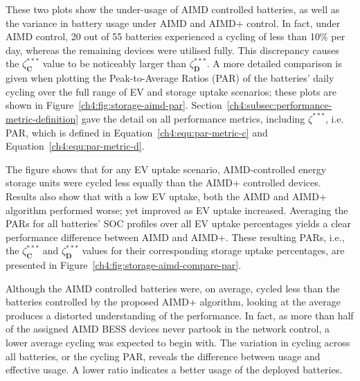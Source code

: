 

These two plots show the under-usage of AIMD controlled batteries, as well as the variance in battery usage under AIMD and AIMD+ control.
In fact, under AIMD control, 20 out of 55 batteries experienced a cycling of less than 10\% per day, whereas the remaining devices were utilised fully.
This discrepancy causes the $\zeta_\textbf{C}^{***}$ value to be noticeably larger than $\zeta_\textbf{D}^{***}$.
A more detailed comparison is given when plotting the Peak-to-Average Ratios (PAR) of the batteries' daily cycling over the full range of EV and storage uptake scenarios; these plots are shown in Figure~\ref{ch4:fig:storage-aimd-par}.
Section~\ref{ch4:subsec:performance-metric-definition} gave the detail on all performance metrics, including $\zeta^{***}$, i.e. PAR, which is defined in Equation~\ref{ch4:equ:par-metric-c} and Equation~\ref{ch4:equ:par-metric-d}.



The figure shows that for any EV uptake scenario, AIMD-controlled energy storage units were cycled less equally than the AIMD+ controlled devices.
Results also show that with a low EV uptake, both the AIMD and AIMD+ algorithm performed worse; yet improved as EV uptake increased.
Averaging the PARs for all batteries' SOC profiles over all EV uptake percentages yields a clear performance difference between AIMD and AIMD+.
These resulting PARs, i.e., the $\zeta_\textbf{C}^{***}$ and $\zeta_\textbf{D}^{***}$ values for their corresponding storage uptake percentages, are presented in Figure~\ref{ch4:fig:storage-aimd-compare-par}.



Although the AIMD controlled batteries were, on average, cycled less than the batteries controlled by the proposed AIMD+ algorithm, looking at the average produces a distorted understanding of the performance.
In fact, as more than half of the assigned AIMD BESS devices never partook in the network control, a lower average cycling was expected to begin with.
The variation in cycling across all batteries, or the cycling PAR, reveals the difference between usage and effective usage.
A lower ratio indicates a better usage of the deployed batteries.